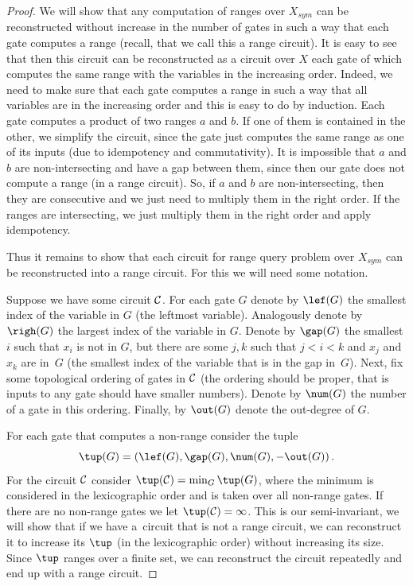 \documentclass{toc}
\begin{document}
\begin{proof}[Proof]
    We will show that any computation of ranges over $X_{sym}$ can be reconstructed without increase in the number of gates in such a way that each gate computes a range (recall, that we call this a range circuit). It is easy to see that then this circuit can be reconstructed as a circuit over $X$ each gate of which computes the same range with the variables in the increasing order. Indeed, we need to make sure that each gate computes a range in such a way that all variables are in the increasing order and this is easy to do by induction. Each gate computes a product of two ranges $a$ and $b$. If one of them is contained in the other, we simplify the circuit, since the gate just computes the same range as one of its inputs (due to idempotency and commutativity). It is impossible that $a$ and $b$ are non-intersecting and have a gap between them, since then our gate does not compute a range (in a range circuit). So, if $a$ and  $b$ are non-intersecting, then they are consecutive and we just need to multiply them in the right order. If the ranges are intersecting, we just multiply them in the right order and apply idempotency.

    Thus it remains to show that each circuit for range query problem over $X_{sym}$ can be reconstructed into a range circuit. For this we will need some notation.

    Suppose we have some circuit ${\cal C}$. For each gate $G$ denote by $\lef(G)$ the smallest index of the variable in $G$ (the leftmost variable). Analogously denote by $\righ(G)$ the largest index of the variable in $G$. Denote by $\gap(G)$ the smallest $i$ such that $x_i$ is not in $G$, but there are some $j,k$ such that $j<i<k$ and $x_j$ and $x_k$ are in~$G$ (the smallest index of the variable that is in the gap in~$G$).
    Next, fix some topological ordering of gates in ${\cal C}$ (the ordering should be proper, that is inputs to any gate should have smaller numbers). Denote by $\num(G)$ the number of a gate in this ordering. Finally, by $\out(G)$ denote the out-degree of $G$.

    For each gate that computes a non-range consider the tuple
    $$
    \tup(G)=(\lef(G),\gap(G),\num(G),-\out(G))\,.
    $$ For the circuit ${\cal C}$ consider $\tup({\cal C}) = \min_G \tup(G)$, where the minimum is considered in the lexicographic order and is taken over all non-range gates. If there are no non-range gates we let $\tup({\cal C})=\infty$. This is our semi-invariant, we will show that if we have a~circuit that is not a range circuit, we can reconstruct it to increase  its $\tup$ (in the lexicographic order) without increasing its size. Since $\tup$ ranges over a finite set, we can reconstruct the circuit repeatedly and end up with a range circuit.


\end{proof}
\end{document}
